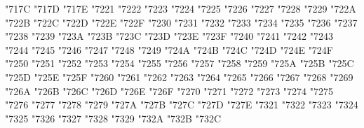 {\Uchar\jis"717C %
\Uchar\jis"717D %
\Uchar\jis"717E %
\Uchar\jis"7221 %
\Uchar\jis"7222 %
\Uchar\jis"7223 %
\Uchar\jis"7224 %
\Uchar\jis"7225 %
\Uchar\jis"7226 %
\Uchar\jis"7227 %
\Uchar\jis"7228 %
\Uchar\jis"7229 %
\Uchar\jis"722A %
\Uchar\jis"722B %
\Uchar\jis"722C %
\Uchar\jis"722D %
\Uchar\jis"722E %
\Uchar\jis"722F %
\Uchar\jis"7230 %
\Uchar\jis"7231 %
\Uchar\jis"7232 %
\Uchar\jis"7233 %
\Uchar\jis"7234 %
\Uchar\jis"7235 %
\Uchar\jis"7236 %
\Uchar\jis"7237 %
\Uchar\jis"7238 %
\Uchar\jis"7239 %
\Uchar\jis"723A %
\Uchar\jis"723B %
\Uchar\jis"723C %
\Uchar\jis"723D %
\Uchar\jis"723E %
\Uchar\jis"723F %
\Uchar\jis"7240 %
\Uchar\jis"7241 %
\Uchar\jis"7242 %
\Uchar\jis"7243 %
\Uchar\jis"7244 %
\Uchar\jis"7245 %
\Uchar\jis"7246 %
\Uchar\jis"7247 %
\Uchar\jis"7248 %
\Uchar\jis"7249 %
\Uchar\jis"724A %
\Uchar\jis"724B %
\Uchar\jis"724C %
\Uchar\jis"724D %
\Uchar\jis"724E %
\Uchar\jis"724F %
\Uchar\jis"7250 %
\Uchar\jis"7251 %
\Uchar\jis"7252 %
\Uchar\jis"7253 %
\Uchar\jis"7254 %
\Uchar\jis"7255 %
\Uchar\jis"7256 %
\Uchar\jis"7257 %
\Uchar\jis"7258 %
\Uchar\jis"7259 %
\Uchar\jis"725A %
\Uchar\jis"725B %
\Uchar\jis"725C %
\Uchar\jis"725D %
\Uchar\jis"725E %
\Uchar\jis"725F %
\Uchar\jis"7260 %
\Uchar\jis"7261 %
\Uchar\jis"7262 %
\Uchar\jis"7263 %
\Uchar\jis"7264 %
\Uchar\jis"7265 %
\Uchar\jis"7266 %
\Uchar\jis"7267 %
\Uchar\jis"7268 %
\Uchar\jis"7269 %
\Uchar\jis"726A %
\Uchar\jis"726B %
\Uchar\jis"726C %
\Uchar\jis"726D %
\Uchar\jis"726E %
\Uchar\jis"726F %
\Uchar\jis"7270 %
\Uchar\jis"7271 %
\Uchar\jis"7272 %
\Uchar\jis"7273 %
\Uchar\jis"7274 %
\Uchar\jis"7275 %
\Uchar\jis"7276 %
\Uchar\jis"7277 %
\Uchar\jis"7278 %
\Uchar\jis"7279 %
\Uchar\jis"727A %
\Uchar\jis"727B %
\Uchar\jis"727C %
\Uchar\jis"727D %
\Uchar\jis"727E %
\Uchar\jis"7321 %
\Uchar\jis"7322 %
\Uchar\jis"7323 %
\Uchar\jis"7324 %
\Uchar\jis"7325 %
\Uchar\jis"7326 %
\Uchar\jis"7327 %
\Uchar\jis"7328 %
\Uchar\jis"7329 %
\Uchar\jis"732A %
\Uchar\jis"732B %
\Uchar\jis"732C %
}
